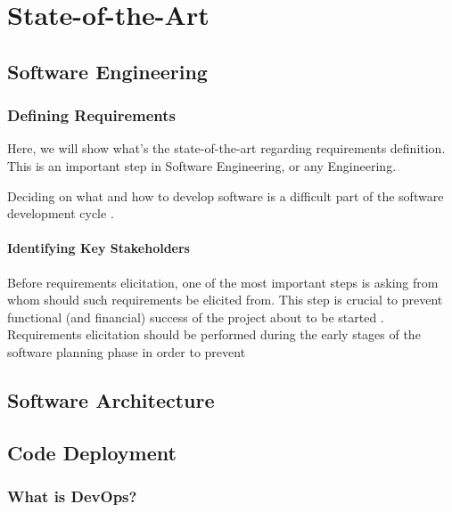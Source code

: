 \chapter{State-of-the-Art}
\label{state-of-the-art}

\section{Software Engineering}
\label{state-of-the-art:s:software-engineering}

\subsection{Defining Requirements}
\label{state-of-the-art:ss:defining-requirements}

Here, we will show what's the state-of-the-art regarding requirements definition. This is an important step in Software Engineering, or any Engineering.

Deciding on what and how to develop software is a difficult part of the software development cycle \parencite{pacheco_garcía_reyes_2018}.

\subsubsection{Identifying Key Stakeholders}\label{state-of-the-art:sss:identifying-key-stakeholders}

Before requirements elicitation, one of the most important steps is asking from whom should such requirements be elicited from. This step is crucial to prevent functional (and financial) success of the project about to be started \parencite{lewellen_2020}. Requirements elicitation should be performed during the early stages of the software planning phase in order to prevent



\section{Software Architecture}
\label{state-of-the-art:s:software-architecture}

\section{Code Deployment}
\label{state-of-the-art:s:code-deployment}

\subsection{What is DevOps?}
\label{state-of-the-art:ss:what-is-devops}

